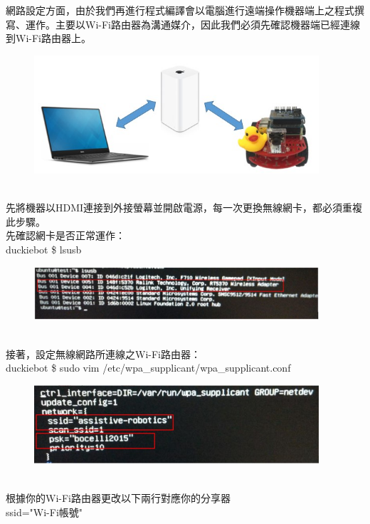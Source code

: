 \documentclass{article}
\begin{document}
網路設定方面，由於我們再進行程式編譯會以電腦進行遠端操作機器端上之程式撰寫、運作。主要以Wi-Fi路由器為溝通媒介，因此我們必須先確認機器端已經連線到Wi-Fi路由器上。
\begin{figure}[htp]
    \begin{center}
        \includegraphics[width=300pt]{pic/圖片9.jpg}
    \end{center}
\end{figure}
\\先將機器以HDMI連接到外接螢幕並開啟電源，每一次更換無線網卡，都必須重複此步驟。
\\先確認網卡是否正常運作：
\\duckiebot \$ lsusb
\begin{figure}[htp]
    \begin{center}
        \includegraphics[width=300pt]{pic/圖片10.jpg}
    \end{center}
\end{figure}
\\接著，設定無線網路所連線之Wi-Fi路由器：
\\duckiebot \$ sudo vim /etc/wpa\_supplicant/wpa\_supplicant.conf
\begin{figure}[htp]
    \begin{center}
        \includegraphics[width=300pt]{pic/圖片11.jpg}
    \end{center}
\end{figure}
\\根據你的Wi-Fi路由器更改以下兩行對應你的分享器
\\ssid="Wi-Fi帳號"
\end{document}
